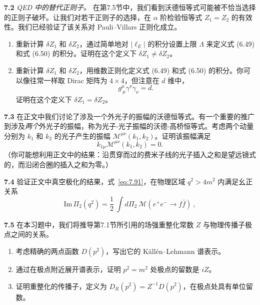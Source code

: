 \textbf{7.2} \emph{QED 中的替代正则子。} 在第7.5节中，我们看到沃德恒等式可能被不恰当选择的正则子破坏。让我们对若干正则子的选择，在 $\alpha$ 阶检验恒等式 $Z_1 = Z_2$ 的有效性。我们已经验证了该关系对 Pauli--Villars 正则化成立。
\begin{enumerate}[label=(\alph*)]
  \item 重新计算 $\delta Z_1$ 和 $\delta Z_2$，通过简单地对 $|\ell_E|$ 的积分设置上限 $\Lambda$ 来定义式 (6.49) 和式 (6.50) 的积分。证明在这个定义下 $\delta Z_1 \neq \delta Z_2$。
  \item 重新计算 $\delta Z_1$ 和 $\delta Z_2$，用维数正则化定义式 (6.49) 和式 (6.50) 的积分。你可以像往常一样取 Dirac 矩阵为 $4\times4$，但注意在 $d$ 维中，
    \begin{equation}
      g^\mu_{\ \mu}\gamma^\nu\gamma_\nu = d .
    \end{equation}
    证明在这个定义下 $\delta Z_1 = \delta Z_2$。
\end{enumerate}

\textbf{7.3} 在正文中我们讨论了涉及一个外光子的振幅的沃德恒等式。有一个重要的推广到涉及\emph{两个}外光子的振幅，称为光子-光子振幅的沃德-高桥恒等式。考虑两个动量分别为 $k_1$ 和 $k_2$ 的光子产生的振幅 $\mathcal{M}^{\mu\nu}(k_1, k_2)$。证明该振幅满足
\begin{equation}
  k_{1\mu}\mathcal{M}^{\mu\nu}(k_1, k_2) = 0 .
\end{equation}
（你可能想利用正文中的结果：沿贯穿而过的费米子线的光子插入之和是望远镜式的，而沿闭合圈的插入之和为零。）

\textbf{7.4} 验证正文中真空极化的结果，式~\eqref{eq:7.91}，在物理区域 $q^2 > 4m^2$ 内满足幺正关系
\begin{equation}
  \mathrm{Im}\,\Pi_2(q^2) = \frac{1}{2}\ \int d\Pi_2\
    \mathcal{M}(e^{+}e^{-}\to f\bar{f})\ ,
\end{equation}

\textbf{7.5} 在本习题中，我们将推导第7.1节所引用的场强重整化常数 $Z$ 与物理传播子极点之间的关系。
\begin{enumerate}[label=(\alph*)]
  \item 考虑精确的两点函数 $D(p^2)$，写出它的 K\"all\'en--Lehmann 谱表示。
  \item 通过在极点附近展开谱表示，证明 $p^2 = m^2$ 处极点的留数是 $iZ$。
  \item 证明重整化的传播子，定义为 $D_R(p^2) = Z^{-1}D(p^2)$，在极点处具有单位留数。
\end{enumerate}
